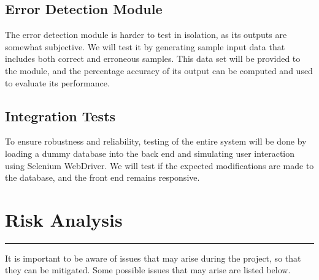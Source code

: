 \documentclass{article}
\begin{document}
\subsection*{Error Detection Module}
The error detection module is harder to test in isolation, as its outputs are somewhat subjective. We will test it by generating sample input data that includes both correct and erroneous samples. This data set will be provided to the module, and the percentage accuracy of its output can be computed and used to evaluate its performance. 

\subsection*{Integration Tests}
To ensure robustness and reliability, testing of the entire system will be done by loading a dummy database into the back end and simulating user interaction using Selenium WebDriver. We will test if the expected modifications are made to the database, and the front end remains responsive.
\newpage
\section*{Risk Analysis}
\hrule
\vspace{9pt}
It is important to be aware of issues that may arise during the project, so that they can be mitigated.  Some possible issues that may arise are listed below. 
\end{document}
